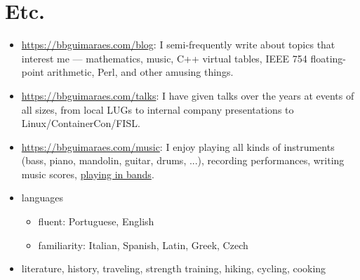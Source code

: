 \section*{Etc.}

\begin{itemize}
    \item
        \url{https://bbguimaraes.com/blog}: I semi-frequently write about topics
        that interest me --- mathematics, music, C++ virtual tables, IEEE 754
        floating-point arithmetic, Perl, and other amusing things.
    \item
        \url{https://bbguimaraes.com/talks}: I have given talks over the years
        at events of all sizes, from local LUGs to internal company
        presentations to Linux\slash ContainerCon\slash FISL.
    \item
        \url{https://bbguimaraes.com/music}: I enjoy playing all kinds of
        instruments (bass, piano, mandolin, guitar, drums, ...), recording
        performances, writing music scores,
        \href{https://www.youtube.com/larajackpot}{playing in bands}.
    \item
        languages
        \begin{itemize}
            \item fluent: Portuguese, English
            \item familiarity: Italian, Spanish, Latin, Greek, Czech
        \end{itemize}
    \item
        literature, history, traveling, strength training, hiking, cycling,
        cooking
\end{itemize}
